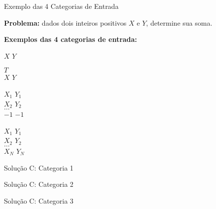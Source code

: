 \begin{frame}[fragile]{Exemplo das 4 Categorias de Entrada}

    \textbf{Problema:} dados dois inteiros positivos $X$ e $Y$, determine sua soma.

    \textbf{Exemplos das 4 categorias de entrada:}

    \begin{minipage}[t]{0.45\textwidth}
    \begin{block}{1}
    $X$ $Y$ \\
    \end{block}
    \end{minipage}
    \begin{minipage}[t]{0.45\textwidth}
    \begin{block}{2}
    $T$ \\
    $X$ $Y$
    \end{block}
    \end{minipage}

    \begin{minipage}[t]{0.45\textwidth}
    \begin{block}{3}
    $X_1$ $Y_1$ \\
    $X_2$ $Y_2$ \\
    $\ldots$ \\
    $-1$ $-1$ 
    \end{block}
    \end{minipage}
    \begin{minipage}[t]{0.45\textwidth}
    \begin{block}{4}
    $X_1$ $Y_1$ \\
    $X_2$ $Y_2$ \\
    $\ldots$ \\
    $X_N$ $Y_N$
    \end{block}
    \end{minipage}

\end{frame}

\begin{frame}[fragile]{Solução C: Categoria 1}
\end{frame}

\begin{frame}[fragile]{Solução C: Categoria 2}
\end{frame}

\begin{frame}[fragile]{Solução C: Categoria 3}
\end{frame}

